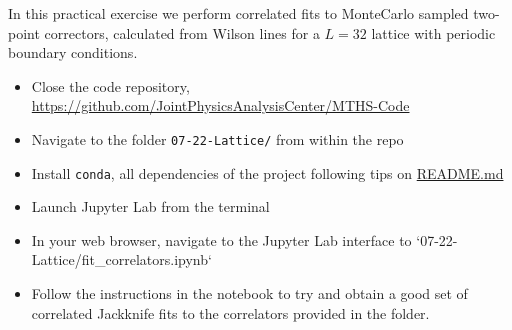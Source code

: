 In this practical exercise we perform correlated fits to
MonteCarlo sampled two-point correctors,
calculated from Wilson lines for a $L=32$ lattice with periodic boundary conditions.

\begin{itemize}
      \item Close the code repository, \href{https://github.com/JointPhysicsAnalysisCenter/MTHS-Code}{https://github.com/JointPhysicsAnalysisCenter/MTHS-Code}
      \item Navigate to the folder \texttt{07-22-Lattice/} from within the repo
      \item Install \texttt{conda}, all dependencies of the project following tips on \href{https://github.com/JointPhysicsAnalysisCenter/MTHS-Code}{README.md}
      \item Launch Jupyter Lab from the terminal
      \item In your web browser, navigate to the Jupyter Lab interface to `07-22-Lattice/fit\_correlators.ipynb`
      \item Follow the instructions in the notebook to try and obtain a good set of correlated Jackknife fits to the correlators provided in the folder.
\end{itemize}